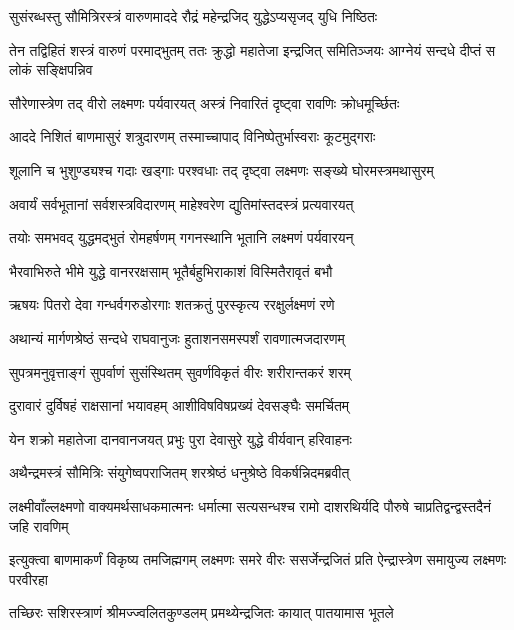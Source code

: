 \twolineshloka
{सुसंरब्धस्तु सौमित्रिरस्त्रं वारुणमाददे}
{रौद्रं महेन्द्रजिद् युद्धेऽप्यसृजद् युधि निष्ठितः} %

\threelineshloka
{तेन तद्विहितं शस्त्रं वारुणं परमाद्भुतम्}
{ततः क्रुद्धो महातेजा इन्द्रजित् समितिञ्जयः}
{आग्नेयं सन्दधे दीप्तं स लोकं सङ्क्षिपन्निव} %

\twolineshloka
{सौरेणास्त्रेण तद् वीरो लक्ष्मणः पर्यवारयत्}
{अस्त्रं निवारितं दृष्ट्वा रावणिः क्रोधमूर्च्छितः} %

\twolineshloka
{आददे निशितं बाणमासुरं शत्रुदारणम्}
{तस्माच्चापाद् विनिष्पेतुर्भास्वराः कूटमुद्गराः} %

\twolineshloka
{शूलानि च भुशुण्ड्यश्च गदाः खड्गाः परश्वधाः}
{तद् दृष्ट्वा लक्ष्मणः सङ्ख्ये घोरमस्त्रमथासुरम्} %

\twolineshloka
{अवार्यं सर्वभूतानां सर्वशस्त्रविदारणम्}
{माहेश्वरेण द्युतिमांस्तदस्त्रं प्रत्यवारयत्} %

\twolineshloka
{तयोः समभवद् युद्धमद्भुतं रोमहर्षणम्}
{गगनस्थानि भूतानि लक्ष्मणं पर्यवारयन्} %

\twolineshloka
{भैरवाभिरुते भीमे युद्धे वानररक्षसाम्}
{भूतैर्बहुभिराकाशं विस्मितैरावृतं बभौ} %

\twolineshloka
{ऋषयः पितरो देवा गन्धर्वगरुडोरगाः}
{शतक्रतुं पुरस्कृत्य ररक्षुर्लक्ष्मणं रणे} %

\twolineshloka
{अथान्यं मार्गणश्रेष्ठं सन्दधे राघवानुजः}
{हुताशनसमस्पर्शं रावणात्मजदारणम्} %

\twolineshloka
{सुपत्रमनुवृत्ताङ्गं सुपर्वाणं सुसंस्थितम्}
{सुवर्णविकृतं वीरः शरीरान्तकरं शरम्} %

\twolineshloka
{दुरावारं दुर्विषहं राक्षसानां भयावहम्}
{आशीविषविषप्रख्यं देवसङ्घैः समर्चितम्} %

\twolineshloka
{येन शक्रो महातेजा दानवानजयत् प्रभुः}
{पुरा देवासुरे युद्धे वीर्यवान् हरिवाहनः} %

\twolineshloka
{अथैन्द्रमस्त्रं सौमित्रिः संयुगेष्वपराजितम्}
{शरश्रेष्ठं धनुश्रेष्ठे विकर्षन्निदमब्रवीत्} %

\threelineshloka
{लक्ष्मीवाँल्लक्ष्मणो वाक्यमर्थसाधकमात्मनः}
{धर्मात्मा सत्यसन्धश्च रामो दाशरथिर्यदि}
{पौरुषे चाप्रतिद्वन्द्वस्तदैनं जहि रावणिम्} %

\threelineshloka
{इत्युक्त्वा बाणमाकर्णं विकृष्य तमजिह्मगम्}
{लक्ष्मणः समरे वीरः ससर्जेन्द्रजितं प्रति}
{ऐन्द्रास्त्रेण समायुज्य लक्ष्मणः परवीरहा} %

\twolineshloka
{तच्छिरः सशिरस्त्राणं श्रीमज्ज्वलितकुण्डलम्}
{प्रमथ्येन्द्रजितः कायात् पातयामास भूतले} %

